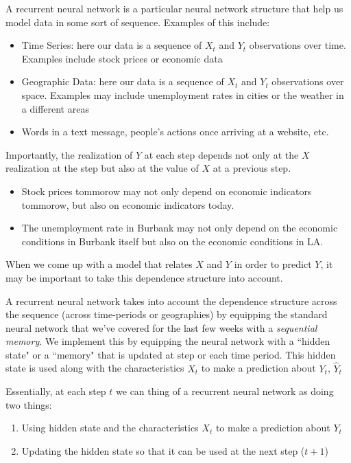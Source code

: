 \documentclass[10pt]{article}
\begin{document}
A recurrent neural network is a particular neural network structure that help us model data in some sort of sequence. Examples of this include:
\begin{itemize}
	\item Time Series: here our data is a sequence of \(X_t\) and  \(Y_t\) observations over time. Examples include stock prices or economic data
	\item Geographic Data: here our data is a sequence of \(X_t\) and  \(Y_t\) observations over space. Examples may include unemployment rates in cities or the weather in a different areas
	\item Words in a text message, people's actions once arriving at a website, etc.
\end{itemize}
Importantly, the realization of \(Y\) at each step depends not only at the \(X\) realization at the step but also at the value of  \(X\) at a previous step.
 \begin{itemize}
	\item Stock prices tommorow may not only depend on economic indicators tommorow, but also on economic indicators today.
	\item The unemployment rate in Burbank may not only depend on the economic conditions in Burbank itself but also on the economic conditions in LA.
\end{itemize}
When we come up with a model that relates \(X\) and  \(Y\) in order to predict  \(Y\), it may be important to take this dependence structure into account. 

A recurrent neural network takes into account the dependence structure across the sequence (across time-periods or geographies) by equipping the standard neural network that we've covered for the last few weeks with a  \textit{sequential memory}. We implement this by equipping the neural network with a ``hidden state" or a ``memory" that is updated at step or each time period. This hidden state is used along with the characteristics \(X_t\) to make a prediction about  \(Y_t\),  \(\hat Y_t\)

Essentially, at each step \(t\) we can thing of a recurrent neural network as doing two things:
\begin{enumerate}
	\item Using hidden state and the characteristics \(X_t\) to make a prediction about  \(Y_t\)
	\item Updating the hidden state so that it can be used at the next step (\(t+1\)) 
\end{enumerate}
\end{document}
